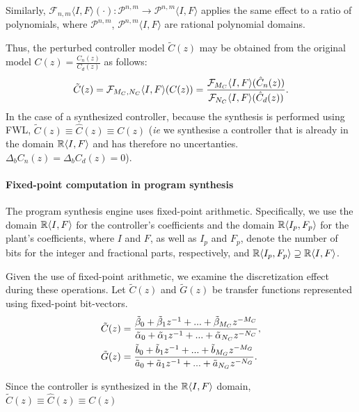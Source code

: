 \documentclass[final]{sig-alternate-05-2015}
\begin{document}
Similarly, $\mathcal{F}_{n,m}\langle I,F \rangle(\cdot):\mathcal{P}^{n,m}\rightarrow \mathcal{P}^{n,m}\langle I,F \rangle$ applies the same effect to a ratio of polynomials, where $\mathcal{P}^{n,m}$,  $\mathcal{P}^{n,m}\langle I,F
\rangle$ are rational polynomial domains.

Thus, the perturbed controller model $\tilde{C}(z)$ may be obtained from the
original model $C(z)=\frac{C_{n}(z)}{C_{d}(z)}$ as follows:
%
\begin{equation}
\tilde{C}(z)=\mathcal{F}_{M_C,N_C}\langle{I},{F}\rangle(C(z))=\frac{\mathcal{F}_{M_C}\langle{I},{F}\rangle (\hat{C}_n(z))}{\mathcal{F}_{N_C}\langle{I},{F}\rangle(\hat{C}_d(z))}.
\end{equation}
%
In the case of a synthesized controller, because the synthesis is performed
using FWL, $\tilde{C}(z) \equiv \hat{C}(z) \equiv C(z)$ (\emph{ie} we synthesise a controller that is already in the domain $\mathbb{R} \langle{I},{F}\rangle$ and has therefore no uncertanties. $\Delta_bC_n(z)=\Delta_bC_d(z)=0$).


\paragraph{Fixed-point computation in program synthesis}

The program synthesis engine uses fixed-point arithmetic.  Specifically, we
use the domain $\mathbb{R}\langle{I},{F}\rangle$ for the controller's coefficients
and the domain $\mathbb{R}\langle{I_p},{F_p}\rangle$ for the plant's coefficients,
where $I$ and $F$, as well as $I_p$ and $F_p$, denote the number of bits for
the integer and fractional parts, respectively, and $\mathbb{R}\langle{
I_p},{F_p}\rangle \supseteq \mathbb{R}\langle{I},{F}\rangle$.


Given the use of fixed-point arithmetic, we examine the discretization effect 
during these operations. Let $\tilde C(z)$ and $\tilde G(z)$ be 
transfer functions represented using fixed-point bit-vectors.
%
\begin{align}
\small
\label{digital_controller_plant_tf}
\tilde C(z)&=\frac{\tilde \beta_{0}+\tilde \beta_{1}z^{-1}+...+\tilde \beta_{M_C}z^{-M_C}}{\tilde \alpha_{0}+\tilde \alpha_{1}z^{-1}+...+\tilde \alpha_{N_C}z^{-N_C}}, \\
\tilde G(z)&=\frac{\tilde b_{0}+\tilde b_{1}z^{-1}+...+\tilde b_{M_G}z^{-M_G}}{\tilde a_{0}+\tilde a_{1}z^{-1}+...+\tilde a_{N_G}z^{-N_G}}.
\end{align}
 
Since the controller is synthesized in the $\mathbb{R}\langle{I},{F}\rangle$
domain, $\tilde{C}(z) \equiv \hat{C}(z) \equiv C(z)$
\end{document}
